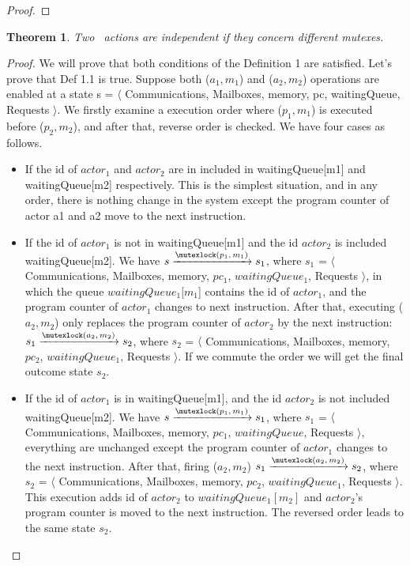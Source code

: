 \documentclass[a4paper,11pt]{article}
\theoremstyle{break}
\newtheorem{theorem}{Theorem}[section]
\begin{document}
\begin{appendices}
\begin{proof}
\end{proof}	
	
\begin{theorem}
Two \mutexlock~actions are independent if they concern different mutexes.
\end{theorem}
\begin{proof}
 We will prove that both conditions of the Definition 1 are satisfied. Let's prove that Def 1.1 is true. Suppose both \mutexlock($a_1,m_1$) and \mutexlock($a_2, m_2$) operations are enabled at a state s = $\langle$ Communications, Mailboxes, memory, pc, waitingQueue, Requests $\rangle$. We firstly examine a execution order where \mutexlock($p_1,m_1$) is executed before \mutexlock($p_2,m_2$), and after that, reverse order is checked. We have four cases as follows. 
 \begin{itemize}
 \item If the id of $actor_1$ and $actor_2$ are in included in waitingQueue[m1] and waitingQueue[m2] respectively. This is the simplest situation, and in any order, there is nothing change in the system except the program counter of actor a1 and a2 move to the next instruction. 
  
 \item If the id of $actor_1$ is not in waitingQueue[m1] and the id $actor_2$ is included waitingQueue[m2]. We have $s\xrightarrow{\mutexlock\text{($p_1, m_1$)}}s_1$, where $s_1$ = $\langle$ Communications, Mailboxes, memory, $pc_1$, $waitingQueue_1$, Requests $\rangle$, in which the queue $waitingQueue_1[m_1$] contains the id of $actor_1$, and the program counter of $actor_1$ changes to next instruction. After that, executing \mutexlock($a_2, m_2$) only replaces the program counter of $actor_2$ by the next instruction:  $s_1\xrightarrow{\mutexlock\text{($a_2, m_2$)}}s_2$, where $s_2$ = $\langle$ Communications, Mailboxes, memory, $pc_2$, $waitingQueue_1$, Requests $\rangle$. If we commute the order we will get the final outcome state $s_2$.
 
 \item If the id of $actor_1$ is in waitingQueue[m1], and the id $actor_2$ is not included waitingQueue[m2]. We have $s\xrightarrow{\mutexlock\text{($p_1, m_1$)}}s_1$, where $s_1$ = $\langle$ Communications, Mailboxes, memory, $pc_1$, $waitingQueue$, Requests $\rangle$, everything are unchanged except the program counter of $actor_1$ changes to the next instruction. After that, firing \mutexlock($a_2, m_2$) $s_1\xrightarrow{\mutexlock\text{($a_2, m_2$)}}s_2$, where $s_2$ = $\langle$ Communications, Mailboxes, memory, $pc_2$, $waitingQueue_1$, Requests $\rangle$. This execution adds id of $actor_2$ to  $waitingQueue_1[m_2]$ and $actor_2$'s program counter is moved to the next instruction. The reversed order leads to the same state $s_2$. 
 

\end{itemize}
\end{proof}
\end{appendices}
\end{document}
